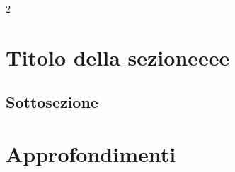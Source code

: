\documentclass{article}
\begin{document}
\begin{multicols}{2} %

\section{Titolo della sezioneeee}

\lipsum[1-3] %

\subsection{Sottosezione}

\lipsum[4][1-3] %

\columnbreak %

\section*{Approfondimenti} %

\lipsum[5][1-3] %

\end{multicols} %

\lipsum[5][4-6] %
\end{document}
